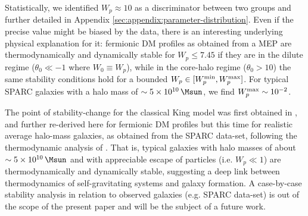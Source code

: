 
Statistically, we identified $W_p \approx 10$ as a discriminator between two groups and further detailed in Appendix \ref{sec:appendix:parameter-distribution}. Even if the precise value might be biased by the data, there is an interesting underlying physical explanation for it: fermionic DM profiles as obtained from a MEP are thermodynamically and dynamically stable for $W_p \leq 7.45$ if they are in the dilute regime ($\theta_0 \ll -1$ where $W_0 \equiv W_p$), while in the core-halo regime ($\theta_0 > 10$) the same stability conditions hold for a bounded $W_p \in [W_p^{\rm min}, W_p^{\rm max}]$. For typical SPARC galaxies with a halo mass of $\sim \SI{5E10}{\Msun}$, we find $W_p^{\rm max}\sim \num{E-2}$. %


The point of stability-change for the classical King model was first obtained in \cite{2015PhRvD..91f3531C}, and further re-derived here for fermionic DM profiles but this time for realistic average halo-mass galaxies, as obtained from the SPARC data-set, following the thermodynamic analysis of \cite{2021MNRAS.502.4227A}. That is, typical galaxies with halo masses of about $\sim \SI{5E10}{\Msun}$ and with appreciable escape of particles (i.e. $W_p \ll 1$) are thermodynamically and dynamically stable, suggesting a deep link between thermodynamics of self-gravitating systems and galaxy formation. A case-by-case stability analysis in relation to observed galaxies (e.g. SPARC data-set) is out of the scope of the present paper and will be the subject of a future work. 
